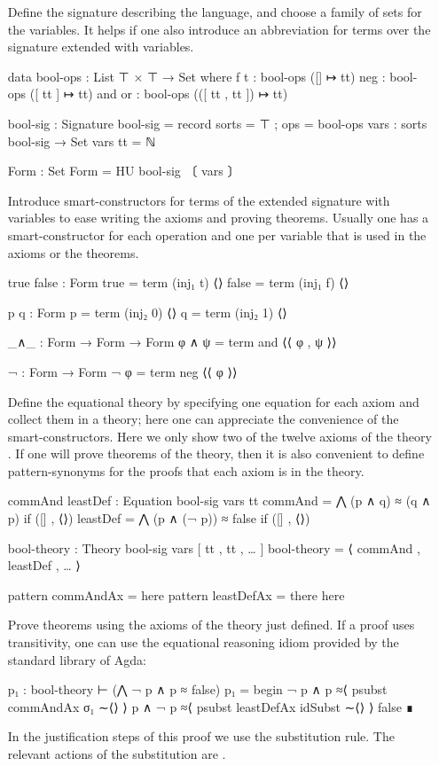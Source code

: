 \begin{itemize}
\item[Define the signature] describing the language, and choose a
  family of sets for the variables. It helps if one also introduce an
  abbreviation for terms over the signature extended with variables.
\begin{spec}
data bool-ops : List ⊤ × ⊤ → Set where
  f t    : bool-ops ([] ↦ tt)
  neg  : bool-ops ([ tt ] ↦ tt)
  and or  : bool-ops (([ tt , tt ]) ↦ tt)

bool-sig : Signature
bool-sig = record { sorts = ⊤ ; ops = bool-ops }
vars : sorts bool-sig → Set
vars tt = ℕ

Form : Set
Form = HU bool-sig 〔 vars 〕
\end{spec}

\item[Introduce smart-constructors] for terms of the extended
  signature with variables to ease writing the axioms and proving
  theorems. Usually one has a smart-constructor for each operation and
  one per variable that is used in the axioms or the theorems.
\begin{spec}
true false : Form
true = term (inj₁ t) ⟨⟩
false = term (inj₁ f) ⟨⟩

p q  : Form
p = term (inj₂ 0) ⟨⟩
q = term (inj₂ 1) ⟨⟩

_∧_ : Form → Form → Form
φ ∧ ψ = term and ⟨⟨ φ , ψ ⟩⟩

¬ : Form → Form
¬ φ = term neg ⟨⟨ φ ⟩⟩
\end{spec}

\item[Define the equational theory] by specifying one equation for
  each axiom and collect them in a theory; here one can appreciate the
  convenience of the smart-constructors. Here we only show two of the
  twelve axioms of the theory . If one will prove theorems
  of the theory, then it is also convenient to define pattern-synonyms
  for the proofs that each axiom is in the theory.
\begin{spec}
commAnd leastDef : Equation bool-sig vars tt
commAnd = ⋀ (p ∧ q) ≈ (q ∧ p) if ([] , ⟨⟩)
leastDef = ⋀ (p ∧ (¬ p)) ≈ false  if ([] , ⟨⟩)

bool-theory : Theory bool-sig vars [ tt , tt , … ]
bool-theory = ⟨ commAnd , leastDef , … ⟩

pattern commAndAx = here
pattern leastDefAx = there here
\end{spec}

\item [Prove theorems] using the axioms of the theory just defined.
  If a proof uses transitivity, one can use the equational reasoning
  idiom provided by the standard library of Agda:
\begin{spec}
  p₁ : bool-theory ⊢ (⋀ ¬ p ∧ p ≈ false)
  p₁ = begin
         ¬ p ∧ p
         ≈⟨ psubst commAndAx σ₁ ∼⟨⟩ ⟩
         p ∧ ¬ p
         ≈⟨ psubst leastDefAx idSubst ∼⟨⟩ ⟩
         false
       ∎
\end{spec}
\noindent In the justification steps of this proof we use the
substitution rule. The relevant actions of the substitution  are
.
\end{itemize}
